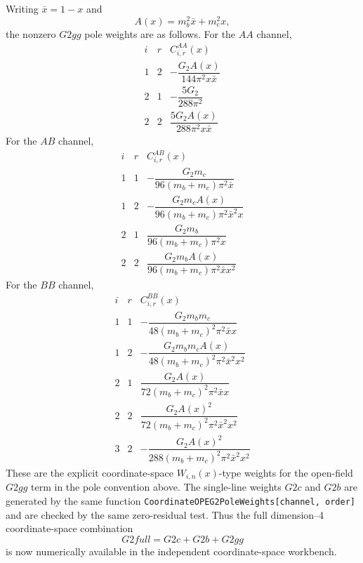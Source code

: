 \documentclass[11pt]{article}
\begin{document}
Writing \(\bar x=1-x\) and
\[
  A(x)=m_b^2\bar x+m_c^2x ,
\]
the nonzero \(G2gg\) pole weights are as follows.  For the \(AA\) channel,
\[
\begin{array}{c|c|c}
i&r&C^{AA}_{i,r}(x)\\ \hline
1&2&-\dfrac{G_2 A(x)}{144\pi^2 x\bar x}\\[4pt]
2&1&-\dfrac{5G_2}{288\pi^2}\\[4pt]
2&2& \dfrac{5G_2 A(x)}{288\pi^2 x\bar x}
\end{array}
\]
For the \(AB\) channel,
\[
\begin{array}{c|c|c}
i&r&C^{AB}_{i,r}(x)\\ \hline
1&1&-\dfrac{G_2m_c}{96(m_b+m_c)\pi^2\bar x}\\[4pt]
1&2&-\dfrac{G_2m_c A(x)}{96(m_b+m_c)\pi^2\bar x^2x}\\[4pt]
2&1& \dfrac{G_2m_b}{96(m_b+m_c)\pi^2x}\\[4pt]
2&2& \dfrac{G_2m_b A(x)}{96(m_b+m_c)\pi^2\bar x x^2}
\end{array}
\]
For the \(BB\) channel,
\[
\begin{array}{c|c|c}
i&r&C^{BB}_{i,r}(x)\\ \hline
1&1&-\dfrac{G_2m_bm_c}{48(m_b+m_c)^2\pi^2\bar x x}\\[4pt]
1&2&-\dfrac{G_2m_bm_c A(x)}{48(m_b+m_c)^2\pi^2\bar x^2x^2}\\[4pt]
2&1& \dfrac{G_2 A(x)}{72(m_b+m_c)^2\pi^2\bar x x}\\[4pt]
2&2& \dfrac{G_2 A(x)^2}{72(m_b+m_c)^2\pi^2\bar x^2x^2}\\[4pt]
3&2&-\dfrac{G_2 A(x)^2}{288(m_b+m_c)^2\pi^2\bar x^2x^2}
\end{array}
\]
These are the explicit coordinate-space \(W_{i,n}(x)\)-type weights for the
open-field \(G2gg\) term in the pole convention above.  The single-line
weights \(G2c\) and \(G2b\) are generated by the same function
\texttt{CoordinateOPEG2PoleWeights[channel, order]} and are checked by the
same zero-residual test.  Thus the full dimension--4 coordinate-space
combination
\[
  G2full=G2c+G2b+G2gg
\]
is now numerically available in the independent coordinate-space workbench.
\end{document}
